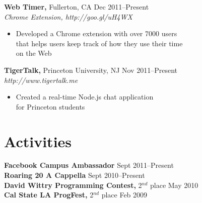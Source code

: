 \documentclass[margin]{res}
\begin{document}
\begin{resume}
 {\bf Web Timer,} Fullerton, CA \hfill Dec 2011--Present \\
 {\it Chrome Extension, http://goo.gl/uH4WX}
 \begin{itemize} \itemsep -2pt  %
 \item Developed a Chrome extension with over 7000 users \\
   that helps users keep track of how they use their time \\
   on the Web
 \end{itemize}

 {\bf TigerTalk,} Princeton University, NJ \hfill Nov 2011--Present \\
 {\it http://www.tigertalk.me}
 \begin{itemize} \itemsep -2pt  %
 \item Created a real-time Node.js chat application \\
   for Princeton students
 \end{itemize}

\section{Activities}
 {\bf Facebook Campus Ambassador} \hfill Sept 2011--Present \\
 {\bf Roaring 20 A Cappella} \hfill Sept 2010--Present \\
 {\bf David Wittry Programming Contest,} 2$^{nd}$ place \hfill May 2010 \\
 {\bf Cal State LA ProgFest,} 2$^{nd}$ place \hfill Feb 2009

\end{resume}
\end{document}
